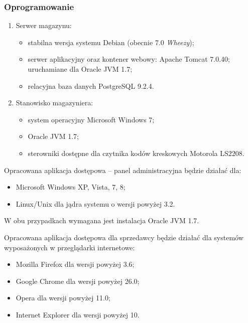 \subsubsection{Oprogramowanie}

\begin{enumerate}
\item Serwer magazynu:
  \begin{itemize}
  \item stabilna wersja systemu Debian (obecnie 7.0 \emph{Wheezy});
  \item serwer aplikacyjny oraz kontener webowy: Apache Tomcat 7.0.40; uruchamiane dla Oracle JVM 1.7;
  \item relacyjna baza danych PostgreSQL 9.2.4.
  \end{itemize}
\item Stanowisko magazyniera:
  \begin{itemize}
  \item system operacyjny Microsoft Windows 7;
  \item Oracle JVM 1.7;
  \item sterowniki dostępne dla czytnika kodów kreskowych Motorola LS2208.
  \end{itemize}
\end{enumerate}

Opracowana aplikacja dostępowa -- panel administracyjna będzie działać dla:
\begin{itemize}
\item Microsoft Windows XP, Vista, 7, 8;
\item Linux/Unix dla jądra systemu o wersji powyżej 3.2.
\end{itemize}
W obu przypadkach wymagana jest instalacja Oracle JVM 1.7.

Opracowana aplikacja dostępowa dla sprzedawcy będzie działać dla systemów
wyposażonych w przeglądarki internetowe:
\begin{itemize}
\item Mozilla Firefox dla wersji powyżej 3.6;
\item Google Chrome dla wersji powyżej 26.0;
\item Opera dla wersji powyżej 11.0;
\item Internet Explorer dla wersji powyżej 10.
\end{itemize}


